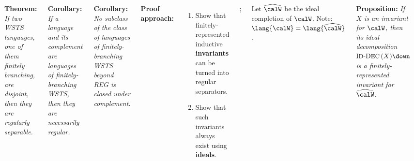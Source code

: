 \documentclass
[
    folder=../style,
    25pt,
    a1paper,
    portrait,
    margin=0mm,
    innermargin=15mm,
    blockverticalspace=15mm,
    colspace=15mm,
    subcolspace=8mm,
]
{../style/smposter}
\newcommand{\fixtitleheight}{\vspace*{-0.2cm}}
\begin{document}
\begin{columns}
{    \vspace*{-0.7cm}
}



\block[]{\ \textcolor{tubsred}{The result \& its consequences}\fixtitleheight}
{
    \textcolor{tubsred}{\textbf{Theorem:}}
    \textit{If two WSTS languages, one of them finitely branching, are disjoint, then they are regularly separable.}
    \vspace*{0.5cm}

    \textbf{Corollary:}%
    \textit{ If a language and its complement are languages of finitely-branching WSTS, then they are necessarily regular.}



    \vspace*{0.5cm}


    \textbf{Corollary:}%
    \:\textit{No subclass of the class of languages of finitely-branching WSTS beyond {\normalfont REG} is closed under complement.}
}


\block[]{}
{
    \vspace*{-0.12cm}
    \textbf{Proof approach:}
    \begin{enumerate}
        \item Show that finitely-represented inductive \textbf{invariants}\\
            can be turned into regular separators.
            \vspace*{-0.2cm}
        \item Show that such invariants always exist using \textbf{ideals}.
    \end{enumerate}
    \vspace*{-0.31cm}
};



{
    Let $\widehat{\calW}$ be the ideal completion of $\calW$.
    Note: $\lang{\calW} = \lang{\widehat{\calW}}$.

    \vspace*{0.5cm}

    \textbf{Proposition:}%
    \textit{ If $X$ is an invariant for $\calW$,
    then its {ideal decomposition} $\text{\normalfont I{\small D}-D{\small EC}}\left(X\right)\!\down$
    is a finitely-represented invariant for~$\widehat{\calW}$.}
}




\end{columns}
\end{document}
